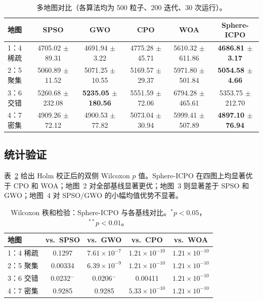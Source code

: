 \documentclass[11pt,a4paper]{ctexart}
\begin{document}
\begin{table}[h]
\centering
\caption{多地图对比（各算法均为 500 粒子、200 迭代、30 次运行）。}
\label{tab:comparison}
\begin{tabular}{lccccc}
\hline
\textbf{地图} & \textbf{SPSO} & \textbf{GWO} & \textbf{CPO} & \textbf{WOA} & \textbf{Sphere-ICPO} \\
\hline
1：4 稀疏 & 4705.02 $\pm$ 89.31 & 4691.94 $\pm$ 3.22 & 4775.28 $\pm$ 45.71 & 5610.32 $\pm$ 611.86 & \textbf{4686.81 $\pm$ 3.17} \\
2：5 聚集 & 5060.89 $\pm$ 11.52 & 5071.25 $\pm$ 10.55 & 5169.57 $\pm$ 29.37 & 5971.80 $\pm$ 501.84 & \textbf{5054.58 $\pm$ 4.66} \\
3：6 交错 & 5260.68 $\pm$ 232.08 & \textbf{5235.05 $\pm$ 180.56} & 5551.59 $\pm$ 72.06 & 6794.28 $\pm$ 465.61 & 5353.75 $\pm$ 212.70 \\
4：7 密集 & 4909.26 $\pm$ 72.12 & 4900.53 $\pm$ 77.82 & 5073.04 $\pm$ 30.94 & 5999.41 $\pm$ 507.89 & \textbf{4897.10 $\pm$ 76.94} \\
\hline
\end{tabular}
\end{table}

\subsection{统计验证}

表~\ref{tab:wilcoxon} 给出 Holm 校正后的双侧 Wilcoxon $p$ 值。Sphere-ICPO 在四图上均显著优于 CPO 和 WOA；地图~2 对全部基线显著更优；地图~3 则显著差于 SPSO 和 GWO；地图~4 对 SPSO/GWO 的小幅均值优势不显著。

\begin{table}[h]
\centering
\caption{Wilcoxon 秩和检验：Sphere-ICPO 与各基线对比。$^*p < 0.05$，$^{**}p < 0.01$。}
\label{tab:wilcoxon}
\begin{tabular}{lcccc}
\hline
\textbf{地图} & \textbf{vs.~SPSO} & \textbf{vs.~GWO} & \textbf{vs.~CPO} & \textbf{vs.~WOA} \\
\hline
1：4 稀疏 & 0.1297 & $7.61\times10^{-7}$ & $1.21\times10^{-10}$ & $1.21\times10^{-10}$ \\
2：5 聚集 & 0.00334 & $6.39\times10^{-9}$ & $1.21\times10^{-10}$ & $1.21\times10^{-10}$ \\
3：6 交错 & 0.0232$^{-}$ & 0.0206$^{-}$ & 0.00411 & $1.21\times10^{-10}$ \\
4：7 密集 & 0.9285 & 0.9285 & $5.33\times10^{-10}$ & $1.21\times10^{-10}$ \\
\hline
\end{tabular}
\end{table}
\end{document}
